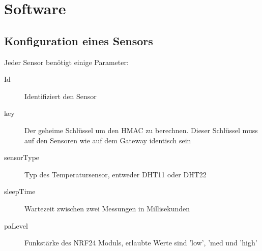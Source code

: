 \documentclass[
  12pt, %
  a4paper, %
  twoside, %
  openany, %
  numbers=noenddot, %
  BCOR=5mm, %
  parskip=half*, %
  thesis, %
]{bfhbook}
\begin{document}
 \section{Software}
 \subsection{Konfiguration eines Sensors}\label{config}
 Jeder Sensor benötigt einige Parameter:
 \begin{description}
\item[Id] Identifiziert den Sensor
\item[key] Der geheime Schlüssel um den \Gls{HMAC} zu berechnen. Dieser Schlüssel muss auf den Sensoren wie auf dem Gateway identisch sein
\item[sensorType] Typ des Temperatursensor, entweder DHT11 oder DHT22
\item[sleepTime] Wartezeit zwischen zwei Messungen in Millisekunden
\item[paLevel] Funkstärke des NRF24 Moduls, erlaubte Werte sind 'low', 'med und 'high'
\end{description}
 
\end{document}
